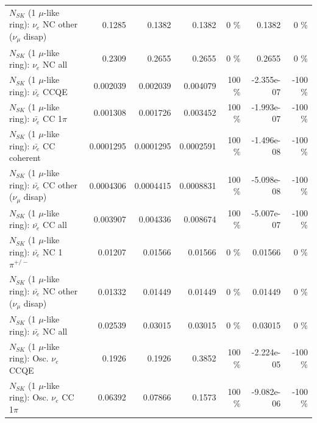 \begin{table}
\begin{tabular}{| l | r | r | r  r | r  r |}
                $N_{SK}$ (1 $\mu$-like ring): $\nu_e$ NC other ($\nu_\mu$ disap) &          0.1285 &          0.1382 &          0.1382 &        0 \%  &          0.1382 &        0 \%  \\ 
                                  $N_{SK}$ (1 $\mu$-like ring): $\nu_{e}$ NC all &          0.2309 &          0.2655 &          0.2655 &        0 \%  &          0.2655 &        0 \%  \\ 
\hline
\hline
\hline
                                $N_{SK}$ (1 $\mu$-like ring): $\bar{\nu_e}$ CCQE &        0.002039 &        0.002039 &        0.004079 &      100 \%  &      -2.355e-07 &     -100 \%  \\ 
                           $N_{SK}$ (1 $\mu$-like ring): $\bar{\nu_e}$ CC 1$\pi$ &        0.001308 &        0.001726 &        0.003452 &      100 \%  &      -1.993e-07 &     -100 \%  \\ 
                         $N_{SK}$ (1 $\mu$-like ring): $\bar{\nu_e}$ CC coherent &       0.0001295 &       0.0001295 &       0.0002591 &      100 \%  &      -1.496e-08 &     -100 \%  \\ 
          $N_{SK}$ (1 $\mu$-like ring): $\bar{\nu_e}$ CC other ($\nu_\mu$ disap) &       0.0004306 &       0.0004415 &       0.0008831 &      100 \%  &      -5.098e-08 &     -100 \%  \\ 
                            $N_{SK}$ (1 $\mu$-like ring): $\bar{\nu_{e}}$ CC all &        0.003907 &        0.004336 &        0.008674 &      100 \%  &      -5.007e-07 &     -100 \%  \\ 
\hline
                     $N_{SK}$ (1 $\mu$-like ring): $\bar{\nu_e}$ NC 1$\pi^{+/-}$ &         0.01207 &         0.01566 &         0.01566 &        0 \%  &         0.01566 &        0 \%  \\ 
          $N_{SK}$ (1 $\mu$-like ring): $\bar{\nu_e}$ NC other ($\nu_\mu$ disap) &         0.01332 &         0.01449 &         0.01449 &        0 \%  &         0.01449 &        0 \%  \\ 
                            $N_{SK}$ (1 $\mu$-like ring): $\bar{\nu_{e}}$ NC all &         0.02539 &         0.03015 &         0.03015 &        0 \%  &         0.03015 &        0 \%  \\ 
\hline
\hline
\hline
                                 $N_{SK}$ (1 $\mu$-like ring): Osc. $\nu_e$ CCQE &          0.1926 &          0.1926 &          0.3852 &      100 \%  &      -2.224e-05 &     -100 \%  \\ 
                            $N_{SK}$ (1 $\mu$-like ring): Osc. $\nu_e$ CC 1$\pi$ &         0.06392 &         0.07866 &          0.1573 &      100 \%  &      -9.082e-06 &     -100 \%  \\ 

\end{tabular}
\end{table}
